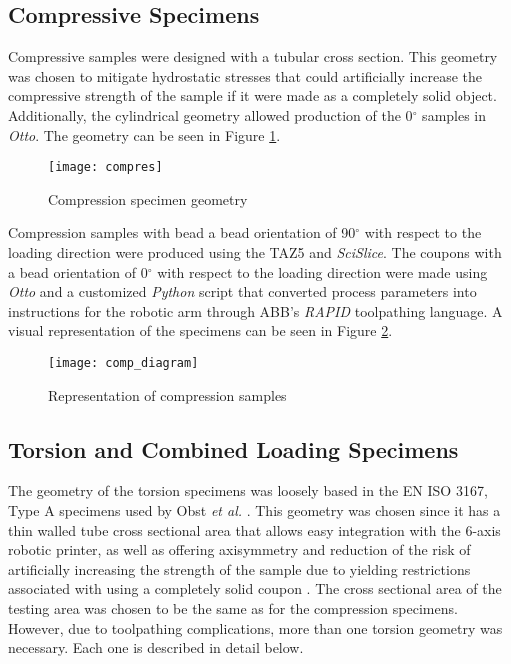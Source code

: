 \documentclass[main.tex]{subfiles}
\begin{document}
\subsection{Compressive Specimens}

Compressive samples were designed with a tubular cross section. This geometry was chosen to mitigate hydrostatic stresses that could artificially increase the compressive strength of the sample if it were made as a completely solid object. Additionally, the cylindrical geometry allowed production of the 0$^\circ$ samples in \emph{Otto}. The geometry can be seen in Figure \ref{fig:comp}.
\begin{figure}[h]
	\center
	\texttt{[image: compres]}
	\caption{Compression specimen geometry} \label{fig:comp}
\end{figure}

Compression samples with bead a bead orientation of 90$^\circ$ with respect to the loading direction were produced using the TAZ5 and \emph{SciSlice}. The coupons with a bead orientation of 0$^\circ$ with respect to the loading direction were made using \emph{Otto} and a customized \emph{Python} script that converted process parameters into instructions for the robotic arm through ABB's \emph{RAPID} toolpathing language. A visual representation of the specimens can be seen in Figure \ref{fig:comp_d}. 
\begin{figure}[h]
	\center
	\texttt{[image: comp\_diagram]}
	\caption{Representation of compression samples} \label{fig:comp_d}
\end{figure}

\subsection{Torsion and Combined Loading Specimens}

The geometry of the torsion specimens was loosely based in the EN ISO 3167, Type A specimens used by Obst \emph{et al.} \cite{Obst2018}. This geometry was chosen since it has a thin walled tube cross sectional area that allows easy integration with the 6-axis robotic printer, as well as offering axisymmetry and reduction of the risk of artificially increasing the strength of the sample due to yielding restrictions associated with using a completely solid coupon \cite{Obst2018}. The cross sectional area of the testing area was chosen to be the same as for the compression specimens. However, due to toolpathing complications, more than one torsion geometry was necessary. Each one is described in detail below.  
\end{document}
